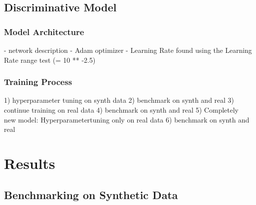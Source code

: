 \documentclass[11pt]{article}
\begin{document}
\subsection{Discriminative Model}
\subsubsection{Model Architecture}
- network description
- Adam optimizer
- Learning Rate found using the Learning Rate range test (= 10 ** -2.5) \cite{smith2018disciplined}


	
	

\subsubsection{Training Process}
1) hyperparameter tuning on synth data
2) benchmark on synth and real
3) continue training on real data
4) benchmark on synth and real
5) Completely new model: Hyperparametertuning only on real data
6) benchmark on synth and real

\section{Results}
\subsection{Benchmarking on Synthetic Data}
\end{document}
